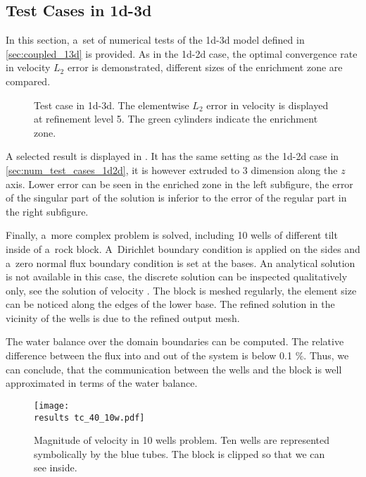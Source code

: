 \subsection{Test Cases in 1d-3d} \label{sec:num_test_cases_1d3d}
In this section, a~set of numerical tests of the 1d-3d model defined in \ref{sec:coupled_13d} is provided.
As in the 1d-2d case, the optimal convergence rate in velocity $L_2$ error is demonstrated,
different sizes of the enrichment zone are compared.

\begin{figure}[!htb]
    \centering
    \caption[Error distribution in 1d-3d.]
    {Test case in 1d-3d. The elementwise $L_2$ error in velocity is displayed at refinement level 5.
    The green cylinders indicate the enrichment zone. }
    \label{fig:mh_tc5_error}
\end{figure}
A selected result is displayed in .
It has the same setting as the 1d-2d case in \ref{sec:num_test_cases_1d2d},
it is however extruded to 3 dimension along the $z$ axis.
Lower error can be seen in the enriched zone in the left subfigure,
the error of the singular part of the solution is inferior to the error of the regular part
in the right subfigure.

\pagebreak

Finally, a~more complex problem is solved, including 10 wells of different tilt inside of a~rock block.
A~Dirichlet boundary condition is applied on the sides and a~zero normal flux boundary condition is set at the bases.
An analytical solution is not available in this case, the discrete solution can be inspected qualitatively only,
see the solution of velocity .
The block is meshed regularly, the element size can be noticed along the edges of the lower base.
The refined solution in the vicinity of the wells is due to the refined output mesh.

The water balance over the domain boundaries can be computed.
The relative difference between the flux into and out of the system is below 0.1 \%.
Thus, we can conclude, that the communication between the wells and the block 
is well approximated in terms of the water balance.

\begin{figure}[!htb]
    \centering
    \texttt{[image: \\results tc\_40\_10w.pdf]}
    \caption[Velocity in 10 wells problem.]
    {Magnitude of velocity in 10 wells problem. Ten wells are represented symbolically by the blue tubes.
    The block is clipped so that we can see inside.}
    \label{fig:mh_tc7_error}
\end{figure}



